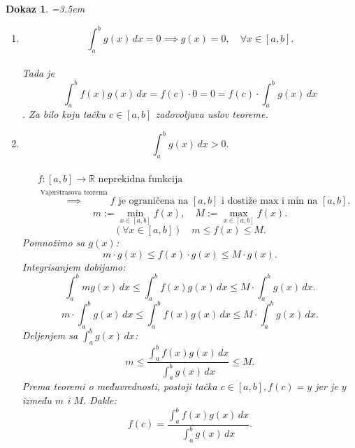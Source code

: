 \documentclass[11pt]{article}
\theoremstyle{plain}
\theoremstyle{serbnodot}
\newtheorem*{dokaz}{Dokaz}
\begin{document}
\begin{dokaz} \quad
    \par\hangindent=3.5em
    \begin{enumerate}
      \item \[ \int_{a}^{b} g(x) \, dx = 0 \implies g(x) = 0, \quad \forall x \in [a,b]. \] \\
      Tada je \[ \int_{a}^{b} f(x) g(x) \, dx = f(c) \cdot 0 = 0 = f(c) \cdot \int_{a}^{b} g(x) \, dx \]. Za bilo koju tačku \( c \in [a,b] \) zadovoljava uslov teoreme.
      \item \[ \int_{a}^{b} g(x) \, dx > 0. \] \\
      \[
        \begin{aligned}
        &f:[a,b]\to\mathbb{R} \text{ neprekidna funkcija} \\
        &\overset{\text{Vajerštrasova teorema}}{\implies}
        f \text{ je ograničena na } [a,b]
        \text{ i dostiže max i min na } [a,b].
        \end{aligned}
      \]
      \[
        m := \min_{x \in [a,b]} f(x), \quad M := \max_{x \in [a,b]} f(x).
      \]
      \[ (\forall x \in [a,b]) \quad m \leq f(x) \leq M. \]
      Pomnožimo sa \( g(x) \):
      \[ m \cdot g(x) \leq f(x) \cdot g(x) \leq M \cdot g(x). \]
      Integrisanjem dobijamo:
      \[
        \int_{a}^{b} m g(x) \, dx \leq \int_{a}^{b} f(x) g(x) \, dx \leq M \cdot \int_{a}^{b} g(x) \, dx. 
      \]
      \[
        m \cdot \int_{a}^{b} g(x) \, dx \leq \int_{a}^{b} f(x) g(x) \, dx \leq M \cdot \int_{a}^{b} g(x) \, dx.
      \]
      Deljenjem sa \( \int_{a}^{b} g(x) \, dx \):
      \[
        m \leq \frac{\int_{a}^{b} f(x) g(x) \, dx}{\int_{a}^{b} g(x) \, dx} \leq M.
      \]
      Prema teoremi o međuvrednosti, postoji tačka \( c \in [a,b], f(c) = y \) jer je \( y \) između \( m \) i \( M \). Dakle:
      \[
        f(c) = \frac{\int_{a}^{b} f(x) g(x) \, dx}{\int_{a}^{b} g(x) \, dx}.
      \]
    \end{enumerate}
\end{dokaz}
\end{document}
